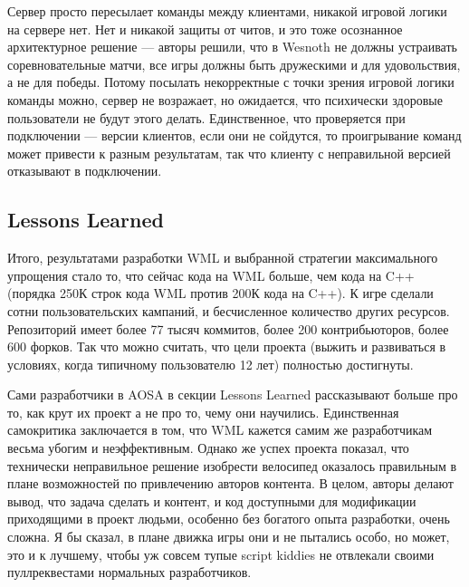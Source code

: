 \documentclass[a5paper]{article}
\begin{document}
Сервер просто пересылает команды между клиентами, никакой игровой логики на сервере нет. Нет и никакой защиты от читов, и это тоже осознанное архитектурное решение --- авторы решили, что в Wesnoth не должны устраивать соревновательные матчи, все игры должны быть дружескими и для удовольствия, а не для победы. Потому посылать некорректные с точки зрения игровой логики команды можно, сервер не возражает, но ожидается, что психически здоровые пользователи не будут этого делать. Единственное, что проверяется при подключении --- версии клиентов, если они не сойдутся, то проигрывание команд может привести к разным результатам, так что клиенту с неправильной версией отказывают в подключении.

\subsection{Lessons Learned}

Итого, результатами разработки WML и выбранной стратегии максимального упрощения стало то, что сейчас кода на WML больше, чем кода на C++ (порядка 250К строк кода WML против 200К кода на C++). К игре сделали сотни пользовательских кампаний, и бесчисленное количество других ресурсов. Репозиторий имеет более 77 тысяч коммитов, более 200 контрибьюторов, более 600 форков. Так что можно считать, что цели проекта (выжить и развиваться в условиях, когда типичному пользователю 12 лет) полностью достигнуты. 

Сами разработчики в AOSA в секции Lessons Learned рассказывают больше про то, как крут их проект а не про то, чему они научились. Единственная самокритика заключается в том, что WML кажется самим же разработчикам весьма убогим и неэффективным. Однако же успех проекта показал, что технически неправильное решение изобрести велосипед оказалось правильным в плане возможностей по привлечению авторов контента. В целом, авторы делают вывод, что задача сделать и контент, и код доступными для модификации приходящими в проект людьми, особенно без богатого опыта разработки, очень сложна. Я бы сказал, в плане движка игры они и не пытались особо, но может, это и к лучшему, чтобы уж совсем тупые script kiddies не отвлекали своими пуллреквестами нормальных разработчиков.
\end{document}
